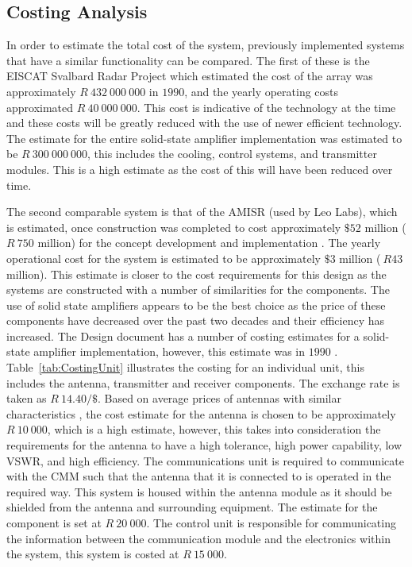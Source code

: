 \documentclass[11pt]{witseiepaper}
\begin{document}
\begin{bibunit}[witseie]
\section{Costing Analysis} \label{sec:CostingAnalysis}
In order to estimate the total cost of the system, previously implemented systems that have a similar functionality can be compared. The first of these is the EISCAT Svalbard Radar Project \cite[p.~670]{EISCATPrice} which estimated the cost of the array was approximately $R~432~000~000$ in $1990$, and the yearly operating costs approximated $R~40~000~000$. This cost is indicative of the technology at the time and these costs will be greatly reduced with the use of newer efficient technology.
The estimate for the entire solid-state amplifier implementation was estimated to be $R~300~000~000$, this includes the cooling, control systems, and transmitter modules. This is a high estimate as the cost of this will have been reduced over time.

The second comparable system is that of the AMISR (used by Leo Labs), which is estimated, once construction was completed to cost approximately $\$52$ million ($R~750$ million) for the concept development and implementation \cite[p.~333-337]{AMISRCosting}. The yearly operational cost for the system is estimated to be approximately $\$3$ million ($~R43$ million). This estimate is closer to the cost requirements for this design as the systems are constructed with a number of similarities for the components.
The use of solid state amplifiers appears to be the best choice as the price of these components have decreased over the past two decades and their efficiency has increased.
The Design document has a number of costing estimates for a solid-state amplifier implementation, however, this estimate was in $1990$ \cite[p.~37]{DesignDraft}.
Table~\ref{tab:CostingUnit} illustrates the costing for an individual unit, this includes the antenna, transmitter and receiver components. The exchange rate is taken as $R~14.40/\$$.
Based on average prices of antennas with similar characteristics \cite{AntennaPrice1,AntennaPrice2,AntennaPrice3,AntennaPrice4,AntennaPrice5}, the cost estimate for the antenna is chosen to be approximately $R~10~000$, which is a high estimate, however, this takes into consideration the requirements for the antenna to have a high tolerance, high power capability, low VSWR, and high efficiency. The communications unit is required to communicate with the CMM such that the antenna that it is connected to is operated in the required way. This system is housed within the antenna module as it should be shielded from the antenna and surrounding equipment. The estimate for the component is set at $R~20~000$. The control unit is responsible for communicating the information between the communication module and the electronics within the system, this system is costed at $R~15~000$.


\end{bibunit}
\end{document}
